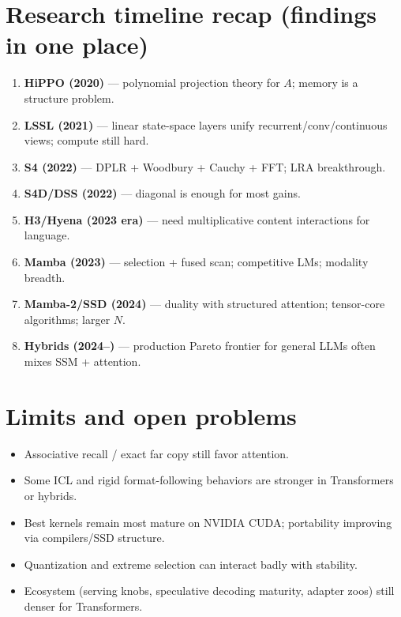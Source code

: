 \documentclass[11pt,a4paper]{article}
\begin{document}
\section{Research timeline recap (findings in one place)}

\begin{enumerate}[leftmargin=*]
  \item \textbf{HiPPO (2020)} --- polynomial projection theory for $A$; memory is a structure problem.
  \item \textbf{LSSL (2021)} --- linear state-space layers unify recurrent/conv/continuous views; compute still hard.
  \item \textbf{S4 (2022)} --- DPLR + Woodbury + Cauchy + FFT; LRA breakthrough.
  \item \textbf{S4D/DSS (2022)} --- diagonal is enough for most gains.
  \item \textbf{H3/Hyena (2023 era)} --- need multiplicative content interactions for language.
  \item \textbf{Mamba (2023)} --- selection + fused scan; competitive LMs; modality breadth.
  \item \textbf{Mamba-2/SSD (2024)} --- duality with structured attention; tensor-core algorithms; larger $N$.
  \item \textbf{Hybrids (2024--)} --- production Pareto frontier for general LLMs often mixes SSM + attention.
\end{enumerate}

\section{Limits and open problems}

\begin{itemize}[leftmargin=*]
  \item Associative recall / exact far copy still favor attention.
  \item Some ICL and rigid format-following behaviors are stronger in Transformers or hybrids.
  \item Best kernels remain most mature on NVIDIA CUDA; portability improving via compilers/SSD structure.
  \item Quantization and extreme selection can interact badly with stability.
  \item Ecosystem (serving knobs, speculative decoding maturity, adapter zoos) still denser for Transformers.
\end{itemize}
\end{document}
